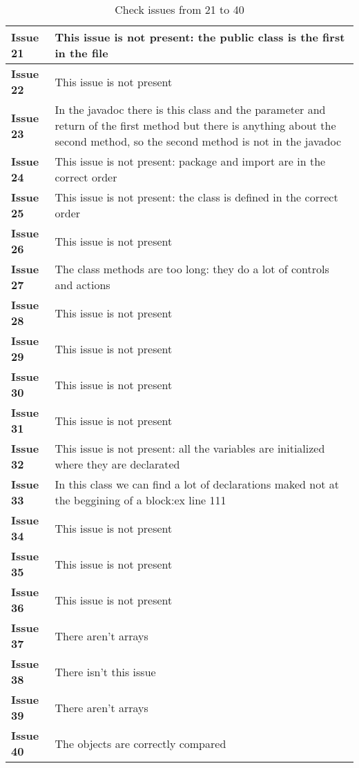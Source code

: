 \begin{table}[htbp]
\begin{center}
\renewcommand{\arraystretch}{1.5}
\begin{tabular}{l|p{}}
\hline
\textbf{Issue 21} & This issue is not present: the public class is the first in the file\\
\hline
\textbf{Issue 22} & This issue is not present\\
\hline
\textbf{Issue 23} & In the javadoc there is this class and the parameter and return of the first method but there is anything about the second method, so the second method is not in the javadoc\\
\hline
\textbf{Issue 24} & This issue is not present: package and import are in the correct order\\
\hline
\textbf{Issue 25} & This issue is not present: the class is defined in the correct order\\
\hline
\textbf{Issue 26} & This issue is not present\\
\hline
\textbf{Issue 27} & The class methods are too long: they do a lot of controls and actions\\
\hline
\textbf{Issue 28} & This issue is not present\\
\hline
\textbf{Issue 29} & This issue is not present\\
\hline
\textbf{Issue 30} & This issue is not present\\
\hline
\textbf{Issue 31} & This issue is not present\\
\hline
\textbf{Issue 32} & This issue is not present: all the variables are initialized where they are declarated\\
\hline
\textbf{Issue 33} & In this class we can find a lot of declarations maked not at the beggining of a block:ex line 111\\
\hline
\textbf{Issue 34} & This issue is not present\\
\hline
\textbf{Issue 35} & This issue is not present\\
\hline
\textbf{Issue 36} & This issue is not present\\
\hline
\textbf{Issue 37} & There aren't arrays\\
\hline
\textbf{Issue 38} & There isn't this issue\\
\hline
\textbf{Issue 39} & There aren't arrays\\
\hline
\textbf{Issue 40} & The objects are correctly compared\\
\hline
\end{tabular}
\caption{Check issues from 21 to 40}
\end{center}
\end{table}

